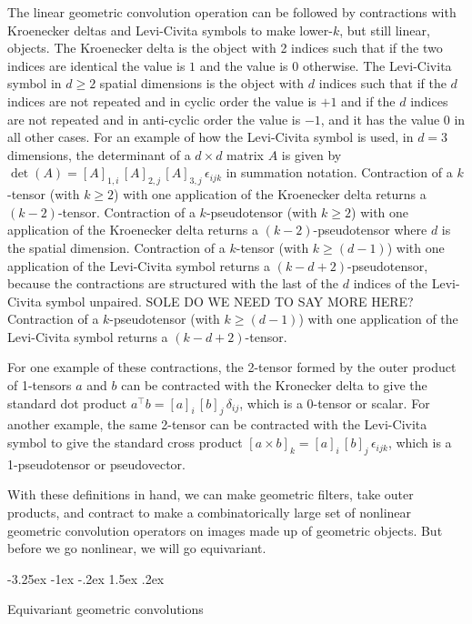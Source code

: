 \documentclass{article}
\makeatletter
\theoremstyle{plain}
\renewcommand\section{\@startsection {section}{1}{\z@}%
  {-3.25ex \@plus -1ex \@minus -.2ex}%
  {1.5ex \@plus .2ex}%
  {\raggedright\normalfont\large\bfseries}}
\makeatother
\begin{document}
The linear geometric convolution operation can be followed by contractions with Kroenecker deltas and Levi-Civita symbols to make lower-$k$, but still linear, objects.
The Kroenecker delta is the object with 2 indices such that if the two indices are identical the value is $1$ and the value is $0$ otherwise.
The Levi-Civita symbol in $d\geq 2$ spatial dimensions is the object with $d$ indices such that if the $d$ indices are not repeated and in cyclic order the value is $+1$ and if the $d$ indices are not repeated and in anti-cyclic order the value is $-1$, and it has the value $0$ in all other cases.
For an example of how the Levi-Civita symbol is used, in $d=3$ dimensions, the determinant of a $d\times d$ matrix $A$ is given by $\det(A) = [A]_{1,i}\,[A]_{2,j}\,[A]_{3,j}\,\epsilon_{ijk}$ in summation notation.
Contraction of a $k$-tensor (with $k\geq 2$) with one application of the Kroenecker delta returns a $(k-2)$-tensor.
Contraction of a $k$-pseudotensor (with $k\geq 2$) with one application of the Kroenecker delta returns a $(k-2)$-pseudotensor where $d$ is the spatial dimension.
Contraction of a $k$-tensor (with $k\geq (d-1)$) with one application of the Levi-Civita symbol returns a $(k-d+2)$-pseudotensor, because the contractions are structured with the last of the $d$ indices of the Levi-Civita symbol unpaired. SOLE DO WE NEED TO SAY MORE HERE?
Contraction of a $k$-pseudotensor (with $k\geq (d-1)$) with one application of the Levi-Civita symbol returns a $(k-d+2)$-tensor.

For one example of these contractions, the 2-tensor formed by the outer product of 1-tensors $a$ and $b$ can be contracted with the Kronecker delta to give the standard dot product $a^\top b = [a]_i\,[b]_j\,\delta_{ij}$, which is a 0-tensor or scalar.
For another example, the same 2-tensor can be contracted with the Levi-Civita symbol to give the standard cross product
$[a\times b]_k = [a]_i\,[b]_j\,\epsilon_{ijk}$, which is a 1-pseudotensor or pseudovector.

With these definitions in hand, we can make geometric filters, take outer products, and contract to make a combinatorically large set of nonlinear geometric convolution operators on images made up of geometric objects.
But before we go nonlinear, we will go equivariant.

\section{Equivariant geometric convolutions}\label{sec:equivariant}
\end{document}
